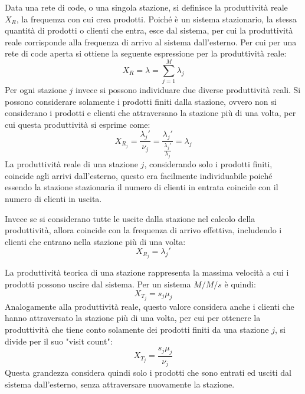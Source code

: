\documentclass{article}
\numberwithin{equation}{subsection}
\begin{document}
Data una rete di code, o una singola stazione, si definisce la produttività reale $X_R$, la frequenza con cui crea prodotti. Poiché è un sistema stazionario, la stessa 
quantità di prodotti o clienti che entra, esce dal sistema, per cui la produttività reale corrisponde alla frequenza di arrivo al sistema dall'esterno. Per cui per una rete di 
code aperta si ottiene la seguente espressione per la produttività reale:
\begin{equation}
    X_R=\lambda=\displaystyle\sum_{j=1}^M\lambda_j
\end{equation}
Per ogni stazione $j$ invece si possono individuare due diverse produttività reali. Si possono considerare solamente i prodotti finiti dalla stazione, ovvero non si considerano 
i prodotti e clienti che attraversano la stazione più di una volta, per cui questa produttività si esprime come:
\begin{equation*}
    X_{R_j}=\displaystyle\frac{\lambda_j'}{\nu_j}=\frac{\lambda_j'}{\frac{\lambda_j'}{\lambda_j}}=\lambda_j
\end{equation*}
La produttività reale di una stazione $j$, considerando solo i prodotti finiti, coincide agli arrivi dall'esterno, questo era facilmente individuabile poiché essendo la 
stazione stazionaria il numero di clienti in entrata coincide con il numero di clienti in uscita. 

Invece se si considerano tutte le uscite dalla stazione nel calcolo della produttività, allora coincide con la frequenza di arrivo effettiva, includendo i clienti che 
entrano nella stazione più di una volta:
\begin{equation*}
    X_{R_j}=\lambda_j'
\end{equation*}

La produttività teorica di una stazione rappresenta la massima velocità a cui i prodotti possono uscire dal sistema. Per un sistema $M/M/s$ è quindi:
\begin{equation*}
    X_{T_j}=s_j\mu_j
\end{equation*}
Analogamente alla produttività reale, questo valore considera anche i clienti che hanno attraversato la stazione più di una volta, per cui per ottenere la produttività che 
tiene conto solamente dei prodotti finiti da una stazione $j$, si divide per il suo "visit count":
\begin{equation*}
    X_{T_j}=\displaystyle\frac{s_j\mu_j}{\nu_j}
\end{equation*}
Questa grandezza considera quindi solo i prodotti che sono entrati ed usciti dal sistema dall'esterno, senza attraversare nuovamente la stazione. 
\end{document}
